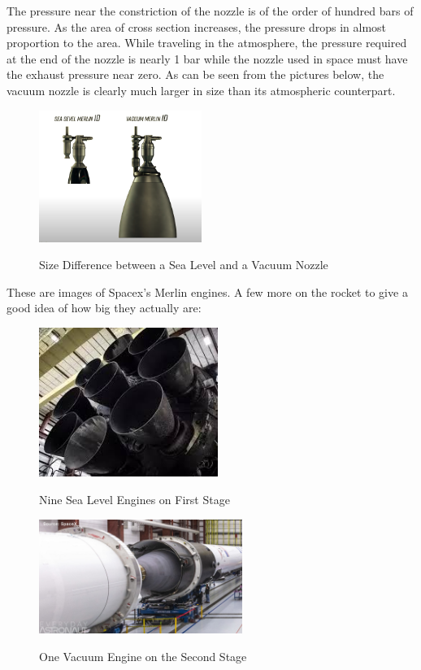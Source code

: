 \documentclass[12pt, letterpaper]{article}
\begin{document}
The pressure near the constriction of the nozzle is of the order of hundred bars of pressure. As the area of cross section increases, the pressure drops in almost proportion to the area. While traveling in the atmosphere, the pressure required at the end of the nozzle is nearly 1 bar while the nozzle used in space must have the exhaust pressure near zero. As can be seen from the pictures below, the vacuum nozzle is clearly much larger in size than its atmospheric counterpart.

\begin{figure}[ht]
	\centering
    \includegraphics[width = 200px]{comp}
    \label{fig:comp}
    \caption{Size Difference between a Sea Level and a Vacuum Nozzle}
\end{figure}

These are images of Spacex's Merlin engines. A few more on the rocket to give a good idea of how big they actually are:

\begin{figure}[ht]
	\centering
    \includegraphics[width = 220px]{nineboosters}
    \label{fig:nineboosters}
    \caption{Nine Sea Level Engines on First Stage}
\end{figure}

\begin{figure}[ht]
	\centering
    \includegraphics[width = 250px]{vacuumnozzle}
    \label{fig:vacuumnozzle}
    \caption{One Vacuum Engine on the Second Stage}
\end{figure}
\end{document}
